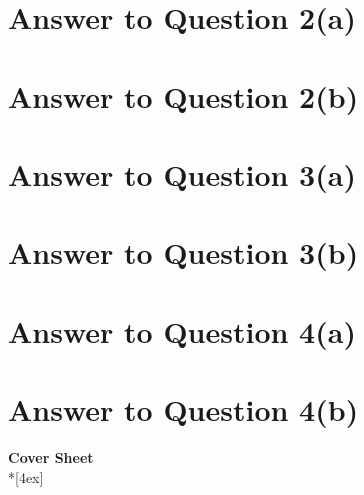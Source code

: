 \documentclass[11pt]{article}
\begin{document}
\pagebreak[4]
\section*{Answer to Question 2(a)}

\pagebreak[4]
\section*{Answer to Question 2(b)}

\pagebreak[4]
\section*{Answer to Question 3(a)}

\pagebreak[4]
\section*{Answer to Question 3(b)}

\pagebreak[4]
\section*{Answer to Question 4(a)}

\pagebreak[4]
\section*{Answer to Question 4(b)}

\pagebreak[4]
\begin{center}
\LARGE{\bf \textsf{Cover Sheet}} \\*[4ex]
\end{center}
\end{document}
